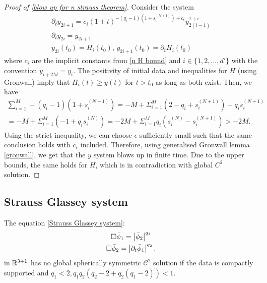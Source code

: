 \documentclass[11pt, oneside]{amsart}
\begin{document}
\begin{proof}[Proof of \cref{blow up for n strauss theorem}]
		Consider the system
		\begin{equation*}
			\begin{gathered}
				\partial_t y_{2i+1}=c_i(1+t)^{-(q_i-1)(1+s_i^{(N+1)})+c_\epsilon}y_{2(i-1)}^{1+\epsilon}\\
				\partial_ty_{2i}=y_{2i+1}\\
				y_{2i}(t_0)=H_i(t_0),\, y_{2i+1}(t_0)=\partial_tH_i(t_0)
			\end{gathered}
		\end{equation*}
		where $c_i$ are the implicit constants from \cref{n H bound} and $i\in\{1,2,...,d'\}$ with the convention $y_{i+2M}=y_i$. The positivity of initial data and inequalities for $H$ (using Gronwall) imply that $H_i(t)\geq y(t)$ for $t>t_0$ as long as both exist. Then, we have
		\begin{equation*}
			\begin{gathered}
				\sum_{i=1}^M -(q_i-1)(1+s_i^{(N+1)})=-M+\Sigma_{i=1}^M (2-q_i+s_i^{(N+1)})-q_is_i^{(N+1)}\\
				=-M+\Sigma_{i=1}^M (-1+q_is_i^{(N)})=-2M+\Sigma_{i=1}^Mq_i(s^{(N)}_i-s^{(N+1)}_{i})>-2M.
			\end{gathered}
		\end{equation*}
		Using the strict inequality, we can choose $\epsilon$ sufficiently small such that the same conclusion holds with $c_\epsilon$ included. Therefore, using generalised Gronwall lemma \cref{gronwall}, we get that the $y$ system blows up in finite time. Due to the upper bounds, the same holds for $H$, which is in contradiction with global $C^2$ solution.
	\end{proof}
		
		
	\subsection{Strauss Glassey system}
	
	\begin{theorem}\label{blow up for Strauss Glassey system}
		The equation \eqref{Strauss Glassey system}:
		\begin{equation*}
			\begin{gathered}
				\Box\bar{\phi}_1=\left\lvert \bar{\phi}_2\right\rvert^{q_1}\\
				\Box\bar{\phi}_2=\left\lvert \partial_t\bar{\phi}_1\right\rvert^{q_2}.
			\end{gathered}
		\end{equation*}
		in $\mathbb{R}^{3+1}$ has no global spherically symmetric $\mathcal{C}^2$ solution if the data is compactly supported and $q_1<2,q_1q_2(q_2-2+q_2(q_1-2))<1$.
	\end{theorem}
	
\end{document}
